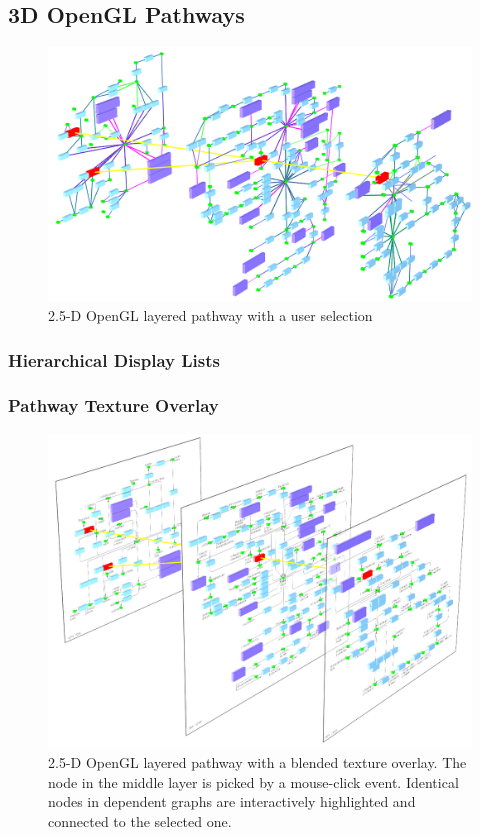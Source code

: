 \subsection{3D OpenGL Pathways}

\begin{figure}
  \centering
    \includegraphics[width=0.7\linewidth]{gfx/opengl_layered_pathway_without_texture}
  \caption{2.5-D OpenGL layered pathway with a user selection}
  \label{fig:opengl_layered_pathway_without_texture}
\end{figure}

\subsubsection{Hierarchical Display Lists}


\subsubsection{Pathway Texture Overlay}

\begin{figure}[ht]
  \centering
    \includegraphics[width=0.7\linewidth]{gfx/opengl_layered_pathway}
  \caption{2.5-D OpenGL layered pathway with a blended texture overlay. The node in the middle layer is picked by a mouse-click event. Identical nodes in dependent graphs are interactively highlighted and connected to the selected one.}
  \label{fig:opengl_layered_pathway}
\end{figure}


